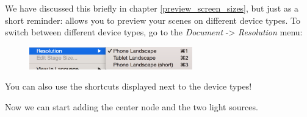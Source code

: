 \begin{details}
We have discussed this briefly in chapter \ref{preview_screen_sizes}, but just
as a short reminder: \SB{} allows you to preview your scenes on different device
types. To switch between different device types, go to the \textit{Document} ->
\textit{Resolution} menu:
\begin{figure}[H]
  \centering
  \includegraphics[width=200pt]{images/Chapter9/select_resolution.png}
\end{figure}
You can also use the shortcuts displayed next to the device types!
\end{details}
Now we can start adding the center node and the two light sources.
